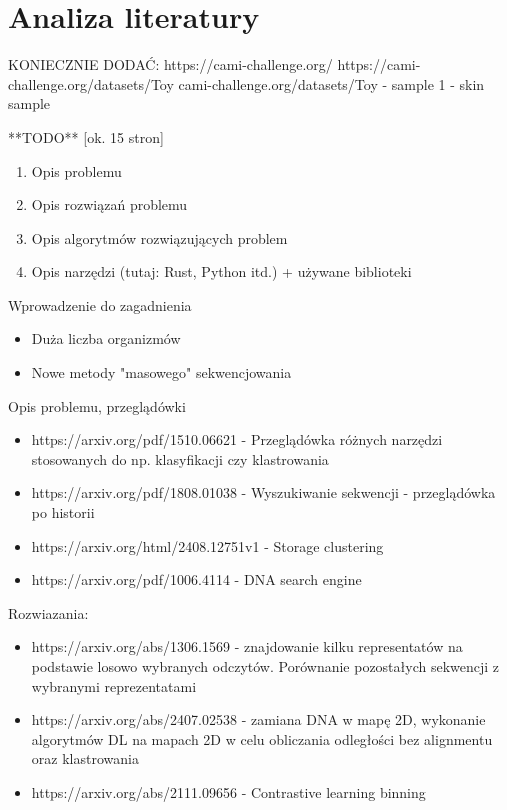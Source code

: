 \clearpage
\section{Analiza literatury}

KONIECZNIE DODAĆ:
https://cami-challenge.org/
https://cami-challenge.org/datasets/Toy%
cami-challenge.org/datasets/Toy%
- sample 1 - skin sample

**TODO** [ok. 15 stron]

\begin{enumerate}
    \item Opis problemu
    \item Opis rozwiązań problemu
    \item Opis algorytmów rozwiązujących problem
    \item Opis narzędzi (tutaj: Rust, Python itd.) + używane biblioteki
\end{enumerate}

Wprowadzenie do zagadnienia
\begin{itemize}
    \item Duża liczba organizmów
    \item Nowe metody "masowego" sekwencjowania
\end{itemize}

Opis problemu, przeglądówki
\begin{itemize}
    \item https://arxiv.org/pdf/1510.06621 - Przeglądówka różnych narzędzi stosowanych do np. klasyfikacji czy klastrowania
    \item https://arxiv.org/pdf/1808.01038 - Wyszukiwanie sekwencji - przeglądówka po historii
    \item https://arxiv.org/html/2408.12751v1 - Storage clustering
    \item https://arxiv.org/pdf/1006.4114 - DNA search engine
\end{itemize}

Rozwiazania:
\begin{itemize}
    \item https://arxiv.org/abs/1306.1569 - znajdowanie kilku representatów na podstawie losowo wybranych odczytów. Porównanie pozostałych sekwencji z wybranymi reprezentatami
    \item https://arxiv.org/abs/2407.02538 - zamiana DNA w mapę 2D, wykonanie algorytmów DL na mapach 2D w celu obliczania odległości bez alignmentu oraz klastrowania
    \item https://arxiv.org/abs/2111.09656 - Contrastive learning binning
\end{itemize}

